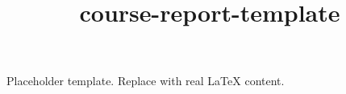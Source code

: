 ﻿\documentclass{article}
\title{course-report-template}
\begin{document}
\maketitle
Placeholder template. Replace with real LaTeX content.
\end{document}

